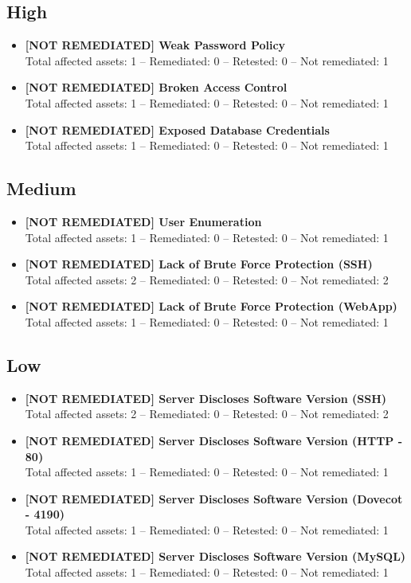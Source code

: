 \documentclass[a4paper,12pt]{article}
\begin{document}
\subsection*{\color{Red}High}
\begin{itemize}
    \item \textbf{[NOT REMEDIATED] Weak Password Policy} \\
    Total affected assets: 1 -- Remediated: 0 -- Retested: 0 -- Not remediated: 1
    \item \textbf{[NOT REMEDIATED] Broken Access Control} \\
    Total affected assets: 1 -- Remediated: 0 -- Retested: 0 -- Not remediated: 1
    \item \textbf{[NOT REMEDIATED] Exposed Database Credentials} \\
    Total affected assets: 1 -- Remediated: 0 -- Retested: 0 -- Not remediated: 1
\end{itemize}

\subsection*{\color{Orange}Medium}
\begin{itemize}
    \item \textbf{[NOT REMEDIATED] User Enumeration} \\
    Total affected assets: 1 -- Remediated: 0 -- Retested: 0 -- Not remediated: 1
    \item \textbf{[NOT REMEDIATED] Lack of Brute Force Protection (SSH)} \\
    Total affected assets: 2 -- Remediated: 0 -- Retested: 0 -- Not remediated: 2
    \item \textbf{[NOT REMEDIATED] Lack of Brute Force Protection (WebApp)} \\
    Total affected assets: 1 -- Remediated: 0 -- Retested: 0 -- Not remediated: 1
\end{itemize}

\subsection*{\color{NavyBlue}Low}
\begin{itemize}
    \item \textbf{[NOT REMEDIATED] Server Discloses Software Version (SSH)} \\
    Total affected assets: 2 -- Remediated: 0 -- Retested: 0 -- Not remediated: 2
    \item \textbf{[NOT REMEDIATED] Server Discloses Software Version (HTTP - 80)} \\
    Total affected assets: 1 -- Remediated: 0 -- Retested: 0 -- Not remediated: 1
    \item \textbf{[NOT REMEDIATED] Server Discloses Software Version (Dovecot - 4190)} \\
    Total affected assets: 1 -- Remediated: 0 -- Retested: 0 -- Not remediated: 1
    \item \textbf{[NOT REMEDIATED] Server Discloses Software Version (MySQL)} \\
    Total affected assets: 1 -- Remediated: 0 -- Retested: 0 -- Not remediated: 1
\end{itemize}
\end{document}

